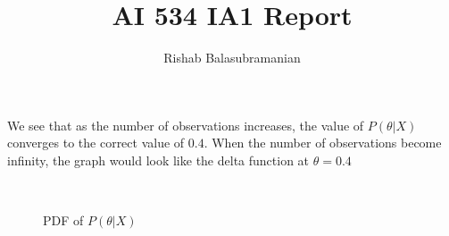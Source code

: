 \documentclass{article}
\title{AI 534 IA1 Report}
\author{Rishab Balasubramanian}
\date{}
\begin{document}

We see that as the number of observations increases, the value of $P(\theta | X)$ converges to the correct value of $0.4$. When the number of observations become infinity, the graph would look like the delta function at $\theta = 0.4$
\begin{figure}[h]
    \centering
    \qquad
    \\
\caption{PDF of $P(\theta | X)$}
\end{figure}
\end{document}
